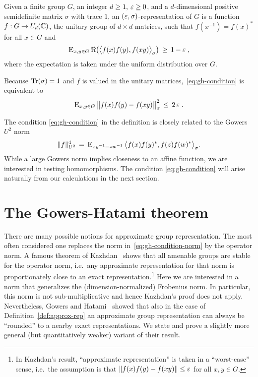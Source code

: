\begin{definition}\label{def:approx-rep}
Given a finite group $G$, an integer $d\geq 1$, $\varepsilon\geq 0$, and a $d$-dimensional positive semidefinite matrix $\sigma$ with trace $1$, an $(\varepsilon,\sigma)$-representation of $G$ is a function $f: G \to U_d(\mathbb{C})$, the unitary group of $d\times d$ matrices, such that $f(x^{-1})=f(x)^*$ for all $x\in G$ and  
\begin{equation}\label{eq:gh-condition}
\textsc{E}_{x,y\in G} \,\Re\big(\big\langle f(x)f(y) ,f(x y) \big\rangle_\sigma\big) \,\geq\, 1-\varepsilon\;,
\end{equation} 
where the expectation is taken under the uniform distribution over $G$.
\end{definition}

Because $\mbox{\rm Tr}(\sigma)=1$ and $f$ is valued in the unitary matrices,~\eqref{eq:gh-condition} is equivalent to 
\begin{equation}\label{eq:gh-condition-norm}
\textsc{E}_{x,y\in G} \, \big\| f(x)f(y) - f(x y) \big\|_\sigma^2 \,\leq\, 2\,\varepsilon\;.
\end{equation} 

\begin{remark}
The condition \eqref{eq:gh-condition} in the definition is closely related to the Gowers $U^2$ norm
$$\|f\|_{U^2}^4 \,=\, \textsc{E}_{xy^{-1}=zw^{-1}}\, \big\langle f(x)f(y)^* ,f(z)f(w)^* \big\rangle_\sigma.$$
While a large Gowers norm implies closeness to an affine function, we are interested in testing homomorphisms. The condition \eqref{eq:gh-condition} will arise naturally from our calculations in the next section. 
\end{remark}

\section{The Gowers-Hatami theorem}

There are many possible notions for approximate group representation. The most often considered one replaces the norm in~\eqref{eq:gh-condition-norm} by the operator norm. A famous theorem of Kazhdan~\cite{kazhdan1982e} shows that all amenable groups are stable for the operator norm, i.e.\ any approximate representation for that norm is proportionately close to an exact representation.\footnote{In Kazhdan's result, ``approximate representation'' is taken in a ``worst-case'' sense, i.e.\ the assumption is that $\|f(x)f(y)-f(xy)\|\leq \varepsilon$ for all $x,y\in G$.} Here we are interested in a norm that generalizes the (dimension-normalized) Frobenius norm. In particular, this norm is not sub-multiplicative and hence Kazhdan's proof does not apply. Nevertheless, 
Gowers and Hatami~\cite{gowers2015inverse} showed that also in the case of Definition~\ref{def:approx-rep} an approximate group representation can always be ``rounded'' to a nearby exact representations. We state and prove a slightly more general (but quantitatively weaker) variant of their result.

